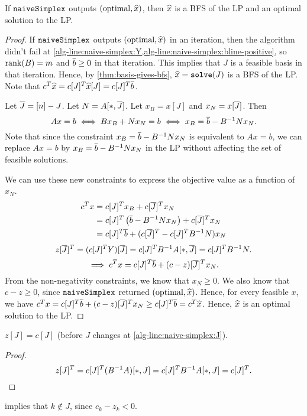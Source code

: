 \begin{theorem}
\label{thm:simplex-optimal}
If $\operatorname{\mathtt{naiveSimplex}}$ outputs $(\textrm{optimal}, \widehat{x})$,
then $\widehat{x}$ is a BFS of the LP and an optimal solution to the LP.
\end{theorem}
\begin{proof}
If $\operatorname{\mathtt{naiveSimplex}}$ outputs $(\textrm{optimal}, \widehat{x})$ in an iteration, then
the algorithm didn't fail at
\cref{alg-line:naive-simplex:Y,alg-line:naive-simplex:bline-positive}, so
$\operatorname{rank}(B) = m$ and $\overline{b} \ge 0$ in that iteration.
This implies that $J$ is a feasible basis in that iteration.
Hence, by \cref{thm:basis-gives-bfs}, $\widehat{x} = \operatorname{\mathtt{solve}}(J)$ is a BFS of the LP.
Note that $c^T\widehat{x} = c[J]^T\widehat{x}[J] = c[J]^T\overline{b}$.

Let $\overline{J} = [n] - J$. Let $N = A[*,\overline{J}]$.
Let $x_B = x[J]$ and $x_N = x[\overline{J}]$. Then
\[ Ax = b \iff Bx_B + Nx_N = b \iff x_B = \overline{b} - B^{-1}Nx_N. \]
Note that since the constraint $x_B = \overline{b} - B^{-1}Nx_N$ is equivalent to $Ax = b$,
we can replace $Ax = b$ by $x_B = \overline{b} - B^{-1}Nx_N$ in the LP without affecting
the set of feasible solutions.

We can use these new constraints to express the objective value as a function of $x_N$.
\begin{align*}
c^Tx &= c[J]^Tx_B + c[\overline{J}]^Tx_N
\\ &= c[J]^T\left(\overline{b} - B^{-1}Nx_N\right) + c[\overline{J}]^Tx_N
\\ &= c[J]^T\overline{b} + (c[\overline{J}]^T - c[J]^TB^{-1}N)x_N
\end{align*}
\[ z[\overline{J}]^T = (c[J]^TY)[\overline{J}] = c[J]^TB^{-1}A[*,\overline{J}] = c[J]^TB^{-1}N. \]
\[ \implies c^Tx = c[J]^T\overline{b} + (c-z)[\overline{J}]^Tx_N. \]
From the non-negativity constraints, we know that $x_N \ge 0$.
We also know that $c-z \ge 0$, since $\operatorname{\mathtt{naiveSimplex}}$ returned
$(\textrm{optimal}, \widehat{x})$.
Hence, for every feasible $x$, we have
$c^Tx = c[J]^T\overline{b} + (c-z)[\overline{J}]^Tx_N \ge c[J]^T\overline{b} = c^T\widehat{x}$.
Hence, $\widehat{x}$ is an optimal solution to the LP.
\end{proof}

\begin{lemma}
\label{thm:zJ-eq-cJ}
$z[J] = c[J]$ (before $J$ changes at \cref{alg-line:naive-simplex:J}).
\end{lemma}
\begin{proof}
\[ z[J]^T = c[J]^T(B^{-1}A)[*,J] = c[J]^TB^{-1}A[*,J] = c[J]^T.  \qedhere \]
\end{proof}
 implies that $k \not\in J$, since $c_k - z_k < 0$.

